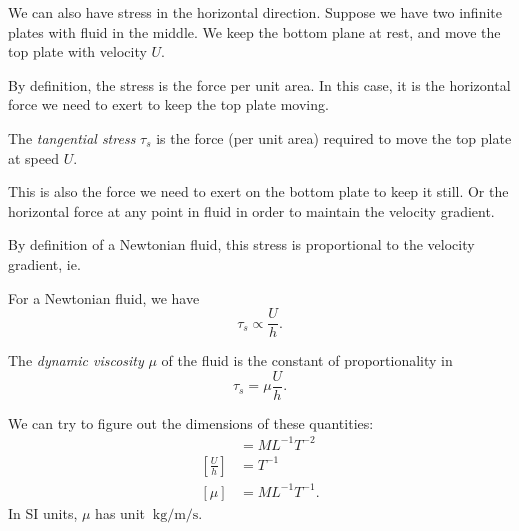 \documentclass[a4paper]{article}
\begin{document}
We can also have stress in the horizontal direction. Suppose we have two infinite plates with fluid in the middle. We keep the bottom plane at rest, and move the top plate with velocity $U$.
\begin{center}
\end{center}
By definition, the stress is the force per unit area. In this case, it is the horizontal force we need to exert to keep the top plate moving.

\begin{defi}
  The \emph{tangential stress} $\tau_s$ is the force (per unit area) required to move the top plate at speed $U$.
\end{defi}
This is also the force we need to exert on the bottom plate to keep it still. Or the horizontal force at any point in fluid in order to maintain the velocity gradient.

By definition of a Newtonian fluid, this stress is proportional to the velocity gradient, ie.
\begin{law}
  For a Newtonian fluid, we have
  \[
    \tau_s \propto \frac{U}{h}.
  \]
\end{law}

\begin{defi}
  The \emph{dynamic viscosity} $\mu$ of the fluid is the constant of proportionality in
  \[
    \tau_s = \mu \frac{U}{h}.
  \]
\end{defi}

We can try to figure out the dimensions of these quantities:
\begin{align*}
  [\tau_s] &= ML^{-1} T^{-2}\\
  \left[\frac{U}{h}\right] &= T^{-1}\\
  [\mu] &= ML^{-1} T^{-1}.
\end{align*}
In SI units, $\mu$ has unit $\SI{}{\kilo\gram\per\meter\per\second}$.
\end{document}
